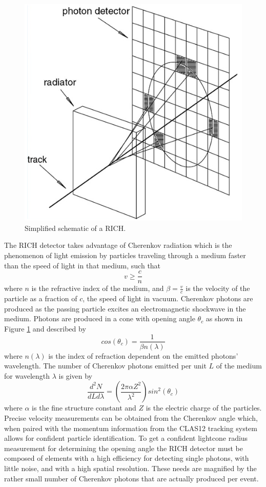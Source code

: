 \documentclass[prc,twocolumn]{revtex4}
\begin{document}
		\begin{figure}
			\includegraphics[width=0.9\linewidth]{cherenkov.png}
			\caption{Simplified schematic of a RICH. \cite{CDR}}
			\label{cherenkov}
		\end{figure}
		
		\indent The RICH detector takes advantage of Cherenkov radiation which is the phenomenon of light emission by particles traveling through a medium faster than the speed of light in that medium, such that
		$$v \geq \frac{c}{n}$$
		where $n$ is the refractive index of the medium, and  $\beta=\frac{v}{c}$ is the velocity of the particle as a fraction of $c$, the speed of light in vacuum. Cherenkov photons are produced as the passing particle excites an electromagnetic shockwave in the medium. Photons are produced in a cone with opening angle $\theta_{c}$ as shown in Figure \ref{cherenkov} and described by
		\begin{equation}
			cos(\theta_{c}) = \frac{1}{\beta n(\lambda)}
			\label{theta}
		\end{equation}
		where $n(\lambda)$ is the index of refraction dependent on the emitted photons' wavelength. The number of Cherenkov photons emitted per unit $L$ of the medium for wavelength $\lambda$ is given by
		\begin{equation}
			\frac{d^{2} N}{d L d \lambda} = \left( \frac{2 \pi \alpha Z^{2}}{\lambda^2}\right) sin^{2}(\theta_c)
			\label{section}
		\end{equation}
		where $\alpha$ is the fine structure constant and $Z$ is the electric charge of the particles. 
		\\
		\indent Precise velocity measurements can be obtained from the Cherenkov angle which, when paired with the momentum information from the CLAS12 tracking system allows for confident particle identification. To get a confident lightcone radius measurement for determining the opening angle the RICH detector must be composed of elements with a high efficiency for detecting single photons, with little noise, and with a high spatial resolution.  These needs are magnified by the rather small number of Cherenkov photons that are actually produced per event.
		
\end{document}
